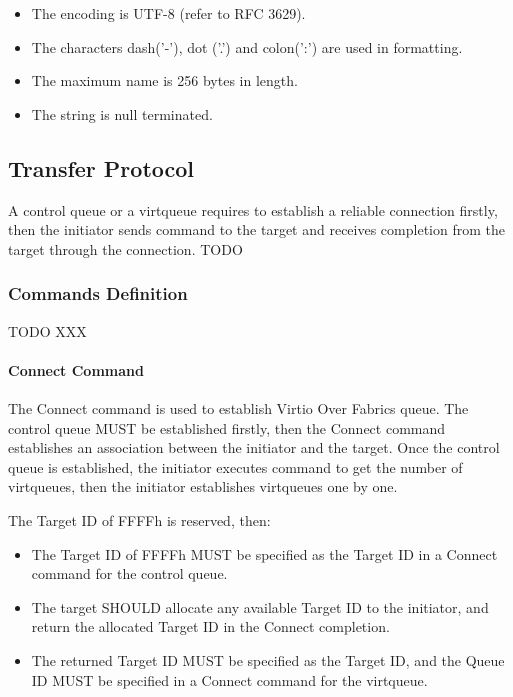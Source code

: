 \begin{itemize}
\item The encoding is UTF-8 (refer to RFC 3629).
\item The characters dash('-'), dot ('.') and colon(':') are used in formatting.
\item The maximum name is 256 bytes in length.
\item The string is null terminated.
\end{itemize}

\subsection{Transfer Protocol}\label{sec:Virtio Transport Options / Virtio Over Fabrics / Transfer Protocol}
A control queue or a virtqueue requires to establish a reliable connection firstly, then the initiator sends command to the target and receives completion from the target through the connection.
TODO

\subsubsection{Commands Definition}\label{sec:Virtio Transport Options / Virtio Over Fabrics / Transfer Protocol / Commands Definition}
TODO XXX

\paragraph{Connect Command}\label{sec:Virtio Transport Options / Virtio Over Fabrics / Transfer Protocol / Commands Definition / Connect Command}
The Connect command is used to establish Virtio Over Fabrics queue. The control queue MUST be established firstly, then the Connect command establishes an association between the initiator and the target. Once the control queue is established, the initiator executes command to get the number of virtqueues, then the initiator establishes virtqueues one by one.

The Target ID of FFFFh is reserved, then:
\begin{itemize}
\item The Target ID of FFFFh MUST be specified as the Target ID in a Connect command for the control queue.
\item The target SHOULD allocate any available Target ID to the initiator, and return the allocated Target ID in the Connect completion.
\item The returned Target ID MUST be specified as the Target ID, and the Queue ID MUST be specified in a Connect command for the virtqueue.
\end{itemize}

